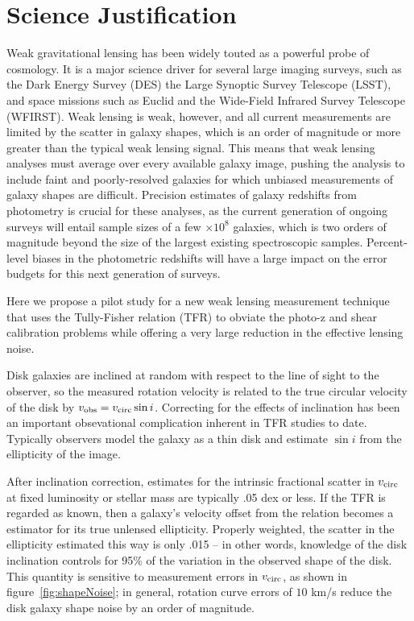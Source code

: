 \documentclass[usenatbib]{aastex}
\begin{document}
\section{Science Justification}
Weak gravitational lensing has been widely touted as a powerful probe of cosmology. It is a major science driver for several large imaging surveys, such as the Dark Energy Survey (DES) the Large Synoptic Survey Telescope (LSST), and space missions such as Euclid and the Wide-Field Infrared Survey Telescope (WFIRST). Weak lensing is weak, however, and all current measurements are limited by the scatter in galaxy shapes, which is an order of magnitude or more greater than the typical weak lensing signal. This means that weak lensing analyses must average over every available galaxy image, pushing the analysis to include faint and poorly-resolved galaxies for which unbiased measurements of galaxy shapes are difficult. Precision estimates of galaxy redshifts from photometry is crucial for these analyses, as the current generation of ongoing surveys will entail sample sizes of a few $\times10^8$ galaxies, which is two orders of magnitude beyond the size of the largest existing spectroscopic samples. Percent-level biases in the photometric redshifts will have a large impact on the error budgets for this next generation of surveys.

Here we propose a pilot study for a new weak lensing measurement technique that uses the Tully-Fisher relation (TFR) to obviate the photo-z and shear calibration problems while offering a very large reduction in the effective lensing noise.

Disk galaxies are inclined at random with respect to the line of sight to the observer, so the measured rotation velocity is related to the true circular velocity of the disk by $v_{\rm obs} = v_{\rm circ} \sin i$. Correcting for the effects of inclination has been an important obsevational complication inherent in TFR studies to date. Typically observers model the galaxy as a thin disk and estimate $\sin i$ from the ellipticity of the image.

After inclination correction, estimates for the intrinsic fractional scatter in $v_{\rm circ}$ at fixed luminosity or stellar mass are typically .05 dex or less. If the TFR is regarded as known, then a galaxy's velocity offset from the relation becomes a estimator for its true unlensed ellipticity. Properly weighted, the scatter in the ellipticity estimated this way is only .015 -- in other words, knowledge of the disk inclination controls for 95\% of the variation in the observed shape of the disk. This quantity is sensitive to measurement errors in $v_{\rm circ}$, as shown in figure~\ref{fig:shapeNoise}; in general, rotation curve errors of $10 $ km/s reduce the disk galaxy shape noise by an order of magnitude.
\end{document}
